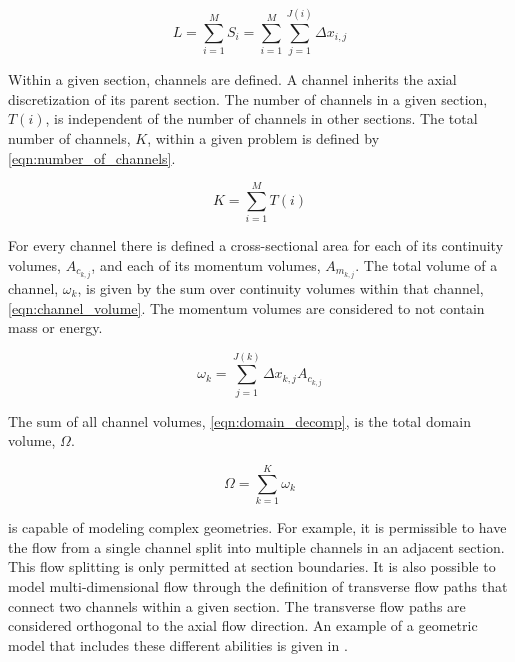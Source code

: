 \begin{equation}
\label{eqn:sections}
L = \sum_{i=1}^{M} S_i = \sum_{i=1}^{M}\sum_{j=1}^{J(i)} \Delta x_{i,j}
\end{equation}

Within a given section, channels are defined.
A channel inherits the axial discretization of its parent section.
The number of channels in a given section, $T(i)$, is independent of the number of channels in other sections.
The total number of channels, $K$, within a given problem is defined by \eqref{eqn:number_of_channels}.

\begin{equation}
\label{eqn:number_of_channels}
K = \sum_{i = 1}^{M} T(i)
\end{equation}

For every channel there is defined a cross-sectional area for each of its continuity volumes, $A_{c_{k,j}}$, and each of its momentum volumes, $A_{m_{k,j}}$.
The total volume of a channel, $\omega_k$, is given by the sum over continuity volumes within that channel, \eqref{eqn:channel_volume}.
The momentum volumes are considered to not contain mass or energy.

\begin{equation}
\label{eqn:channel_volume}
\omega_k = \sum_{j = 1}^{J(k)} \Delta x_{k,j} A_{c_{k,j}}
\end{equation}

The sum of all channel volumes, \eqref{eqn:domain_decomp}, is the total domain volume, $\Omega$.

\begin{equation}
\label{eqn:domain_decomp}
\Omega = \sum_{k = 1}^{K} \omega_{k}
\end{equation}

\cobra{} is capable of modeling complex geometries.
For example, it is permissible to have the flow from a single channel split into multiple channels in an adjacent section.
This flow splitting is only permitted at section boundaries.
It is also possible to model multi-dimensional flow through the definition of transverse flow paths that connect two channels within a given section.
The transverse flow paths are considered orthogonal to the axial flow direction.
An example of a geometric model that includes these different abilities is given in .

